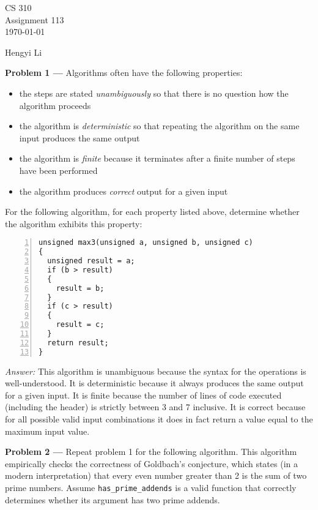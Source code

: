 \documentclass[11pt]{article}
\newcommand{\name}{Hengyi Li}
\newcommand{\problem}[1]{\vspace*{2ex}\textbf{Problem #1 ---} }
\newcommand{\answer}{\textit{Answer: }}
\begin{document}
\thispagestyle{empty}

\begin{center}
{\large CS 310}\\
Assignment 113\\
\today
\end{center}

\begin{flushright}
\name{}
\end{flushright}

\problem{1} Algorithms often have the following properties:

\begin{itemize}
\item the steps are stated \emph{unambiguously} so that there is
  no question how the algorithm proceeds
\item the algorithm is \emph{deterministic} so that repeating the
  algorithm on the same input produces the same output
\item the algorithm is \emph{finite} because it terminates after a
  finite number of steps have been performed
\item the algorithm produces \emph{correct} output for a given input
\end{itemize}

For the following algorithm, for each property listed above, determine
whether the algorithm exhibits this property:

\begin{Verbatim}[numbers=left,xleftmargin=5mm]
unsigned max3(unsigned a, unsigned b, unsigned c)
{
  unsigned result = a;
  if (b > result)
  {
    result = b;
  }
  if (c > result)
  {
    result = c;
  }
  return result;
}
\end{Verbatim}

\answer This algorithm is unambiguous because the syntax for the
operations is well-understood.  It is deterministic because it always
produces the same output for a given input.  It is finite because the
number of lines of code executed (including the header) is strictly
between 3 and 7 inclusive.  It is correct because for all possible
valid input combinations it does in fact return a value equal to the
maximum input value.

\problem{2} Repeat problem 1 for the following algorithm.  This
algorithm empirically checks the correctness of Goldbach's conjecture,
which states (in a modern interpretation) that every even number
greater than 2 is the sum of two prime numbers.  Assume
\verb.has_prime_addends. is a valid function that correctly determines
whether its argument has two prime addends.
\end{document}
